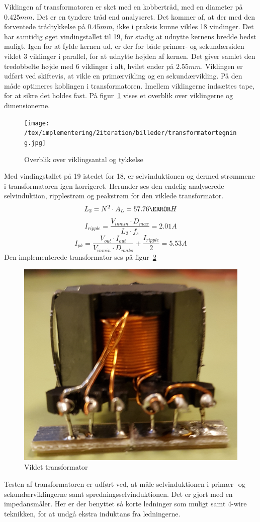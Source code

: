 Viklingen af transformatoren er sket med en kobbertråd, med en diameter på $0.425mm$. Det er en tyndere tråd end analyseret. Det kommer af, at der med den forventede trådtykkelse på $0.45mm$, ikke i praksis kunne vikles 18 vindinger. Det har samtidig øget vindingstallet til 19, for stadig at udnytte kernens bredde bedst muligt. Igen for at fylde kernen ud, er der for både primær- og sekundærsiden viklet 3 viklinger i parallel, for at udnytte højden af kernen. Det giver samlet den tredobbelte højde med 6 viklinger i alt, hvilet ender på $2.55mm$. Viklingen er udført ved skiftevis, at vikle en primærvikling og en sekundærvikling. På den måde optimeres koblingen i transformatoren. Imellem viklingerne indsættes tape, for at sikre det holdes fast. På figur~\ref{fig: viklingsoverblik} vises et overblik over viklingerne og dimensionerne. 
\begin{figure}[H]
	\center
	\texttt{[image: /tex/implementering/2iteration/billeder/transformatortegning.jpg]}
	\caption{Overblik over viklingsantal og tykkelse}
	\label{fig: viklingsoverblik}
\end{figure}
\noindent Med vindingstallet på 19 istedet for 18, er selvinduktionen og dermed strømmene i transformatoren igen korrigeret. Herunder ses den endelig analyserede selvinduktion, ripplestrøm og peakstrøm for den viklede transformator.
\begin{equation} \label{L_2}
L_2 = N^2 \cdot A_L = 57.76\micro H
\end{equation}
\begin{equation} \label{I_ripple_final}
I_{ripple} = \frac{V_{inmin} \cdot D_{max}}{L_2 \cdot f_s} = 2.01A
\end{equation}
\begin{equation} \label{I_pk_final}
I_{pk} = \frac{V_{out} \cdot I_{out}}{V_{inmin} \cdot D_{maks}} + \frac{I_{ripple}}{2} = 5.53A
\end{equation}
Den implementerede transformator ses på figur~\ref{fig: Viklettrans}
\begin{figure}[H]
	\center
	\includegraphics[max width=0.5\linewidth]{../dokumentation/tex/2iteration/billeder/Viklet_transformator.PNG}
	\caption{Viklet transformator}
	\label{fig: Viklettrans}
\end{figure}
\noindent Testen af transformatoren er udført ved, at måle selvinduktionen i primær- og sekundærviklingerne samt spredningsselvinduktionen. Det er gjort med en impedansmåler. Her er der benyttet så korte ledninger som muligt samt 4-wire teknikken, for at undgå ekstra induktans fra ledningerne. 


